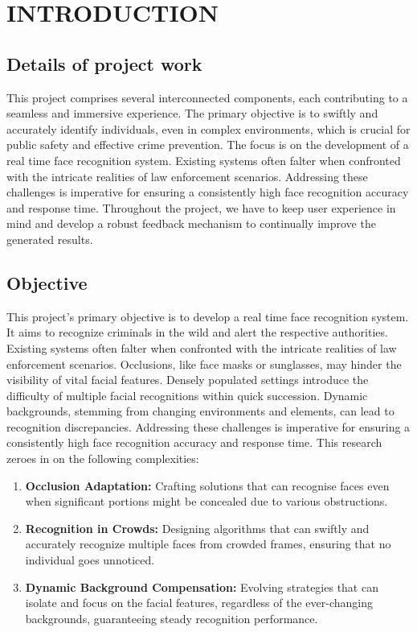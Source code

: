\chapter{INTRODUCTION}

\section{Details of project work}
	This project comprises several interconnected components, each contributing to a seamless and immersive experience. The primary objective is to swiftly and accurately identify individuals, even in complex environments, which is crucial for public safety and effective crime prevention. The focus is on the development of a real time face recognition system. Existing systems often falter when confronted with the intricate realities of law enforcement scenarios. Addressing these challenges is imperative for ensuring a consistently high face recognition accuracy and response time. Throughout the project, we have to keep user experience in mind and develop a robust feedback mechanism to continually improve the generated results.

\section{Objective}
	This project's primary objective is to develop a real time face recognition system. It aims to recognize criminals in the wild and alert the respective authorities. Existing systems often falter when confronted with the intricate realities of law enforcement scenarios. Occlusions, like face masks or sunglasses, may hinder the visibility of vital facial features. Densely populated settings introduce the difficulty of multiple facial recognitions within quick succession. Dynamic backgrounds, stemming from changing environments and elements, can lead to recognition discrepancies. Addressing these challenges is imperative for ensuring a consistently high face recognition accuracy and response time. This research zeroes in on the following complexities:
	\begin{enumerate}
		\item \textbf{Occlusion Adaptation:} Crafting solutions that can recognise faces even when significant portions might be concealed due to various obstructions.

		\item \textbf{Recognition in Crowds:} Designing algorithms that can swiftly and accurately recognize multiple faces from crowded frames, ensuring that no individual goes unnoticed.
		
		\item \textbf{Dynamic Background Compensation:} Evolving strategies that can isolate and focus on the facial features, regardless of the ever-changing backgrounds, guaranteeing steady recognition performance.
		
	\end{enumerate}
	

